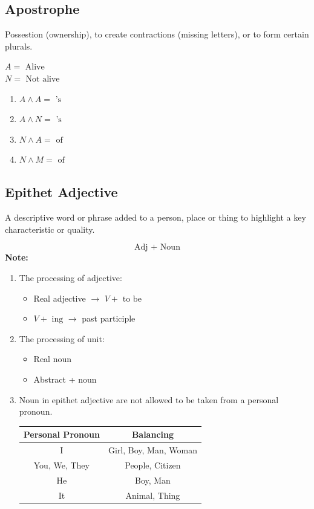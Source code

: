 \subsection{Apostrophe}
\begin{definition}[Apostrophe]
  Possestion (ownership), to create contractions (missing letters), or to form certain plurals.
\end{definition}
  $A = \text{ Alive}$ \\
  $N = \text{ Not alive}$ \\
\begin{enumerate}
\item $A \land A = \text{ 's}$
\item $A \land N = \text{ 's}$
\item $N \land A = \text{ of}$
\item $N \land M = \text{ of}$
\end{enumerate}

\subsection{Epithet Adjective}
\begin{definition}
  A descriptive word or phrase added to a person, place or thing to highlight a key characteristic or quality.
\end{definition}
$$\text{Adj } + \text{ Noun}$$
\textbf{Note: }
\begin{enumerate}
\item The processing of adjective:
  \begin{itemize}
  \item Real adjective $\to$ $V + \text{ to be}$
  \item $V + \text{ ing } \to $ past participle
  \end{itemize}
\item The processing of unit:
  \begin{itemize}
  \item Real noun
  \item Abstract + noun
  \end{itemize}
\item Noun in epithet adjective are not allowed to be taken from a personal pronoun.
  \begin{table}[H]
    \centering
    \begin{tabular}{cc}
      \toprule
      \textbf{Personal Pronoun} & \textbf{Balancing} \\ \midrule
      I & Girl, Boy, Man, Woman \\
      You, We, They & People, Citizen \\
      He & Boy, Man \\
      It & Animal, Thing \\ \bottomrule
    \end{tabular}
  \end{table}
\end{enumerate}

